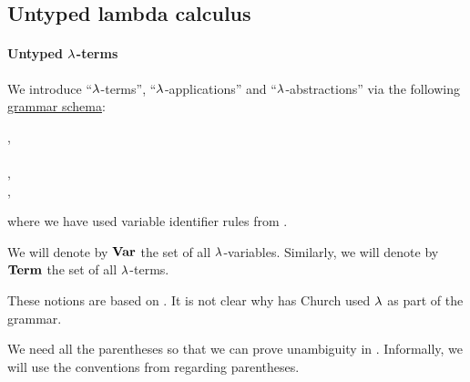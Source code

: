 \subsection{Untyped lambda calculus}\label{subsec:untyped_lambda_calculus}

\paragraph{Untyped \( \synlambda \)-terms}

\begin{definition}\label{def:untyped_lambda_term}\mimprovised
  We introduce \enquote{\( \synlambda \)-terms}, \enquote{\( \synlambda \)-applications} and \enquote{\( \synlambda \)-abstractions} via the following \hyperref[def:formal_grammar/schema]{grammar schema}:
  \begin{bnf*}
        {}, \\
     {\bnftsq{\( ( \)} \bnfsp {} \bnfsp {} \bnfsp \bnftsq{\( ) \)}} \\
     {\bnftsq{\( ( \)} \bnfsp \bnftsq{\( \synlambda \)} \bnfsp {} \bnfsp {} \bnfsp {} \bnfsp \bnftsq{\( ) \)}}, \\
            { \bnfor {} \bnfor {}},
  \end{bnf*}
  where we have used variable identifier rules from .

  \begin{thmenum}
     We will denote by \( \op*{Var} \) the set of all \( \synlambda \)-variables.
     Similarly, we will denote by \( \op*{Term} \) the set of all \( \synlambda \)-terms.
  \end{thmenum}
\end{definition}
\begin{comments}
  \item These notions are based on \cite[352]{Church1932}. It is not clear why has Church used \( \synlambda \) as part of the grammar.

  \item We need all the parentheses so that we can prove unambiguity in . Informally, we will use the conventions from  regarding parentheses.
\end{comments}

